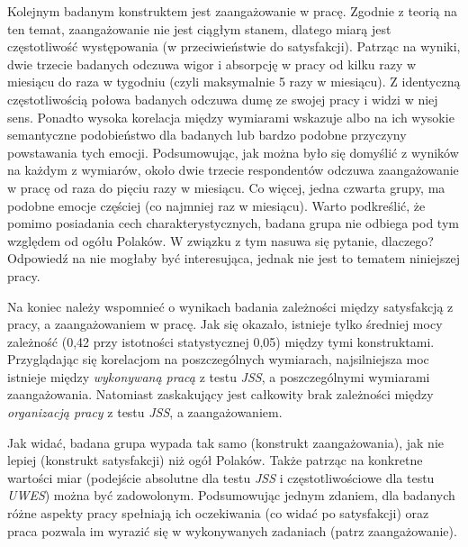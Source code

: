 Kolejnym badanym konstruktem jest zaangażowanie w pracę. Zgodnie z teorią na ten temat, zaangażowanie nie jest ciągłym stanem, dlatego miarą jest częstotliwość występowania (w przeciwieństwie do satysfakcji). Patrząc na wyniki, dwie trzecie badanych odczuwa wigor i absorpcję w pracy od kilku razy w miesiącu do raza w tygodniu (czyli maksymalnie 5 razy w miesiącu). Z identyczną częstotliwością połowa badanych odczuwa dumę ze swojej pracy i widzi w niej sens. Ponadto wysoka korelacja między wymiarami wskazuje albo na ich wysokie semantyczne podobieństwo dla badanych lub bardzo podobne przyczyny powstawania tych emocji. Podsumowując, jak można było się domyślić z wyników na każdym z wymiarów, około dwie
trzecie respondentów odczuwa zaangażowanie w pracę od raza do pięciu razy w miesiącu. Co więcej, jedna czwarta grupy, ma podobne emocje częściej (co najmniej raz w miesiącu). Warto podkreślić, że pomimo posiadania cech charakterystycznych, badana grupa nie odbiega pod tym względem od ogółu Polaków. W związku z tym nasuwa się pytanie, dlaczego? Odpowiedź na nie mogłaby być interesująca, jednak nie jest to tematem niniejszej pracy. 

Na koniec należy wspomnieć o wynikach badania zależności między satysfakcją z pracy, a zaangażowaniem w pracę. Jak się okazało, istnieje tylko średniej mocy zależność (0,42 przy istotności statystycznej 0,05) między tymi konstruktami. Przyglądając się korelacjom na poszczególnych wymiarach, najsilniejsza moc istnieje między \textit{wykonywaną pracą} z testu \emph{JSS}, a poszczególnymi wymiarami zaangażowania. Natomiast zaskakujący jest całkowity brak zależności między
\textit{organizacją pracy} z testu \emph{JSS}, a zaangażowaniem.

  Jak widać, badana grupa wypada tak samo (konstrukt zaangażowania), jak nie lepiej (konstrukt satysfakcji) niż ogół Polaków. Także patrząc na konkretne wartości miar (podejście absolutne dla testu \emph{JSS} i częstotliwościowe dla testu \emph{UWES}) można być zadowolonym. Podsumowując jednym zdaniem, dla badanych różne aspekty pracy spełniają ich oczekiwania (co widać po satysfakcji) oraz praca pozwala im wyrazić się w wykonywanych zadaniach (patrz zaangażowanie).
